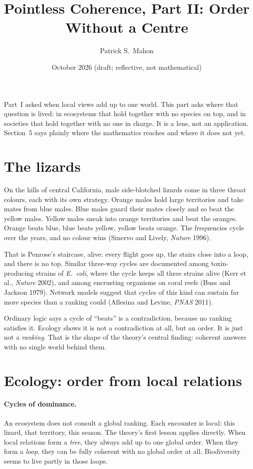 \documentclass[11pt]{article}
\title{Pointless Coherence, Part II: Order Without a Centre}
\author{Patrick S.\ Mahon}
\date{October 2026 \quad (draft; reflective, not mathematical)}
\begin{document}
\maketitle

\begin{mdframed}[backgroundcolor=black!4,linewidth=0.4pt]
Part~I asked when local views add up to one world. This part asks where that
question is lived: in ecosystems that hold together with no species on top, and
in societies that hold together with no one in charge. It is a lens, not an
application. Section~5 says plainly where the mathematics reaches and where it
does not yet.
\end{mdframed}

\section{The lizards}
On the hills of central California, male side-blotched lizards come in three
throat colours, each with its own strategy. Orange males hold large territories
and take mates from blue males. Blue males guard their mates closely and so beat
the yellow males. Yellow males sneak into orange territories and beat the
oranges. Orange beats blue, blue beats yellow, yellow beats orange. The
frequencies cycle over the years, and no colour wins (Sinervo and Lively,
\emph{Nature} 1996).

That is Penrose's staircase, alive: every flight goes up, the stairs close into
a loop, and there is no top. Similar three-way cycles are documented among
toxin-producing strains of \emph{E.\ coli}, where the cycle keeps all three
strains alive (Kerr et al., \emph{Nature} 2002), and among encrusting
organisms on coral reefs (Buss and Jackson 1979). Network models suggest that
cycles of this kind can sustain far more species than a ranking could (Allesina
and Levine, \emph{PNAS} 2011).

Ordinary logic says a cycle of ``beats'' is a contradiction, because no ranking
satisfies it. Ecology shows it is not a contradiction at all, but an order. It
is just not a \emph{ranking}. That is the shape of the theory's central finding:
coherent answers with no single world behind them.

\section{Ecology: order from local relations}
\paragraph{Cycles of dominance.} An ecosystem does not consult a global
ranking. Each encounter is local: this lizard, that territory, this season. The
theory's first lesson applies directly. When local relations form a \emph{tree},
they always add up to one global order. When they form a \emph{loop}, they can
be fully coherent with no global order at all. Biodiversity seems to live partly
in those loops.
\end{document}

